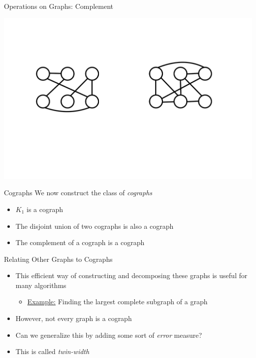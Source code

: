 \documentclass[aspectratio=169]{beamer}
\begin{document}
\begin{frame}{Operations on Graphs: Complement}
    \begin{center}
        \includegraphics[width=1.0\textwidth]{images/output-17-0.jpg}
    \end{center}
\end{frame}


\begin{frame}{Cographs}
    We now construct the class of \textcolor{sigma@mainblue}{\emph{cographs}}\pause
    \begin{itemize}
        \item $K_1$ is a cograph
        \item The disjoint union of two cographs is also a cograph
        \item The complement of a cograph is a cograph
    \end{itemize}
\end{frame}

\begin{frame}{Relating Other Graphs to Cographs}
    \begin{itemize}
        \item This efficient way of constructing and decomposing these graphs is useful for many algorithms
        \begin{itemize}
            \item \underline{Example:} Finding the largest complete subgraph of a graph
        \end{itemize} \pause
        \item However, not every graph is a cograph 
        \item Can we generalize this by adding some sort of \textcolor{sigma@alertred}{\emph{error}} measure? \pause
        \item This is called \textcolor{sigma@mainblue}{\emph{twin-width}} \cite{Twin-width-I}
    \end{itemize}
\end{frame}
\end{document}

